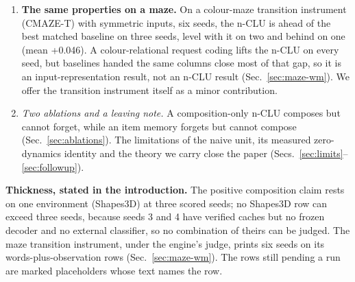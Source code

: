 \documentclass{article} %
\begin{document}
\begin{enumerate}
  takes 2,367 to 5,913 s, so this is neither a size nor a speed claim. Refusal after deletion is a %
  separate, structural mechanism, a hole in a coupling table (Sec.~\ref{sec:hole}).
\item \textbf{The same properties on a maze.} On a colour-maze transition instrument (CMAZE-T) with
  symmetric inputs, six seeds, the n-CLU is ahead of
  the best matched baseline on three seeds, level with it on two and behind on one (mean
  +0.046). A colour-relational request coding lifts the n-CLU on every seed, but baselines handed the %
  same columns close most of that gap, so it is an input-representation result, not an n-CLU result
  (Sec.~\ref{sec:maze-wm}). We offer the transition instrument itself as a minor contribution.
\item \emph{Two ablations and a leaving note.} A composition-only n-CLU composes but cannot
  forget, while an item memory forgets but cannot compose (Sec.~\ref{sec:ablations}). The
  limitations of the naive unit, its measured zero-dynamics identity and the theory we carry
  close the paper (Secs.~\ref{sec:limits}--\ref{sec:followup}).
\end{enumerate}

\noindent\textbf{Thickness, stated in the introduction.} The positive composition claim rests
on one environment (Shapes3D) at three scored seeds; no Shapes3D row can exceed three seeds,
because seeds 3 and 4 have verified caches but no frozen decoder and no external classifier, so no
combination of theirs can be judged. %
The maze transition instrument, under the engine's judge, prints six seeds on its words-plus-observation rows
(Sec.~\ref{sec:maze-wm}). The rows still pending a run are marked placeholders whose text names the row.

\end{document}
